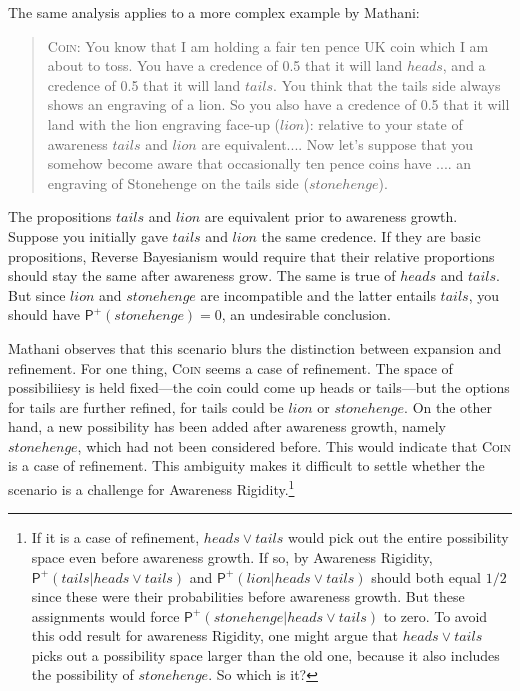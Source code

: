\documentclass[
  11pt,
  dvipsnames,enabledeprecatedfontcommands]{scrartcl}
\newcommand{\ppr}[2]{\ensuremath{\mathsf{P}^{#1}(#2)}}
\begin{document}
The same analysis applies to a more complex example by Mathani:

\begin{quote} 
\textsc{Coin}: You know that I am holding a fair ten pence UK coin which I am about to toss. You
have a credence of 0.5 that it will land $heads$, and a credence of 0.5 that it will
land $tails$. You think that the tails side always shows an engraving of a lion. So you
also  have a credence of 0.5 that it will land with the lion engraving face-up ($lion$): relative to your state of awareness $tails$ and $lion$ are equivalent.... Now let's suppose that you somehow become aware that occasionally ten pence coins have .... an engraving of Stonehenge on the tails side ($stonehenge$). 
\end{quote}

\doublespace

\noindent  The propositions \(tails\) and \(lion\) are equivalent prior
to awareness growth. Suppose you initially gave \(tails\) and \(lion\)
the same credence. If they are basic propositions, Reverse Bayesianism
would require that their relative proportions should stay the same after
awareness grow. The same is true of \(heads\) and \(tails\). But since
\(lion\) and \(stonehenge\) are incompatible and the latter entails
\(tails\), you should have \(\ppr{+}{stonehenge} = 0\), an undesirable
conclusion.

Mathani observes that this scenario blurs the distinction between
expansion and refinement. For one thing, \textsc{Coin} seems a case of
refinement. The space of possibiliiesy is held fixed---the coin could
come up heads or tails---but the options for tails are further refined,
for tails could be \(lion\) or \(stonehenge\). On the other hand, a new
possibility has been added after awareness growth, namely
\(stonehenge\), which had not been considered before. This would
indicate that \textsc{Coin} is a case of refinement. This ambiguity
makes it difficult to settle whether the scenario is a challenge for
Awareness Rigidity.\footnote{ If it is a case of refinement,
  \(heads \vee tails\) would pick out the entire possibility space even
  before awareness growth. If so, by Awareness Rigidity,
  \(\ppr{+}{tails \vert heads \vee tails}\) and
  \(\ppr{+}{lion \vert heads \vee tails}\) should both equal \(1/2\)
  since these were their probabilities before awareness growth. But
  these assignments would force
  \(\ppr{+}{stonehenge \vert heads \vee tails}\) to zero. To avoid this
  odd result for awareness Rigidity, one might argue that
  \(heads \vee tails\) picks out a possibility space larger than the old
  one, because it also includes the possibility of \(stonehenge\). So
  which is it?}
\end{document}
